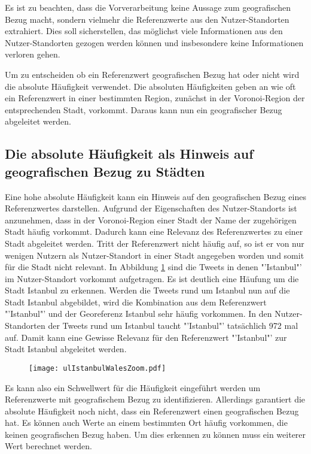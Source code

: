 		Es ist zu beachten, dass die Vorverarbeitung keine Aussage zum geografischen Bezug macht, sondern vielmehr die Referenzwerte aus den Nutzer-Standorten extrahiert. 
		Dies soll sicherstellen, das möglichst viele Informationen aus den Nutzer-Standorten gezogen werden können und insbesondere keine Informationen verloren gehen.  
		
		Um zu entscheiden ob ein Referenzwert geografischen Bezug hat oder nicht wird die absolute Häufigkeit verwendet.
		Die absoluten Häufigkeiten geben an wie oft ein Referenzwert in einer bestimmten Region, zunächst in der Voronoi-Region der entsprechenden Stadt, vorkommt.			 
		Daraus kann nun ein geografischer Bezug abgeleitet werden.

		\subsection{Die absolute Häufigkeit als Hinweis auf geografischen Bezug zu Städten} 
			
			Eine hohe absolute Häufigkeit kann ein Hinweis auf den geografischen Bezug eines Referenzwertes darstellen. 
			Aufgrund der Eigenschaften des Nutzer-Standorts ist anzunehmen, dass in der Voronoi-Region einer Stadt der Name der zugehörigen Stadt häufig vorkommt.
			Dadurch kann eine Relevanz des Referenzwertes zu einer Stadt abgeleitet werden. 
			Tritt der Referenzwert nicht häufig auf, so ist er von nur wenigen Nutzern als Nutzer-Standort in einer Stadt angegeben worden und somit für die Stadt nicht relevant.
			In Abbildung \ref{img:ulIstanbulWalesZoom} sind die Tweets in denen "'Istanbul"' im Nutzer-Standort vorkommt aufgetragen.
			Es ist deutlich eine Häufung um die Stadt Istanbul zu erkennen. 
			Werden die Tweets rund um Istanbul nun auf die Stadt Istanbul abgebildet, wird die Kombination aus dem Referenzwert "'Istanbul"' und der Georeferenz Istanbul sehr häufig vorkommen.
			In den Nutzer-Standorten der Tweets rund um Istanbul taucht "'Istanbul"' tatsächlich 972 mal auf.
			Damit kann eine Gewisse Relevanz für den Referenzwert "'Istanbul"' zur Stadt Istanbul abgeleitet werden.

			\begin{figure}[!ht]
					\begin{center}
						\texttt{[image: ulIstanbulWalesZoom.pdf]}
						\caption{}
						\label{img:ulIstanbulWalesZoom}
					\end{center}
			\end{figure}	

			Es kann also ein Schwellwert für die Häufigkeit eingeführt werden um Referenzwerte mit geografischem Bezug zu identifizieren.
			Allerdings garantiert die absolute Häufigkeit noch nicht, dass ein Referenzwert einen geografischen Bezug hat. 
			Es können auch Werte an einem bestimmten Ort häufig vorkommen, die keinen geografischen Bezug haben.
			Um dies erkennen zu können muss ein weiterer Wert berechnet werden.

